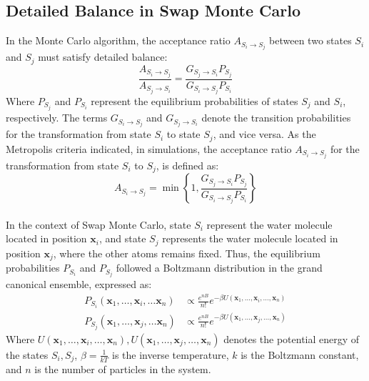 \documentclass[journal=jacsat,manuscript=article]{achemso}
\begin{document}
\subsection{Detailed Balance in Swap Monte Carlo}
In the Monte Carlo algorithm, the acceptance ratio $A_{S_i \to S_j}$ between two states $S_i$ and $S_j$ must satisfy detailed balance:
\begin{equation}\label{eq:acceptance_ratio}
\frac{A_{S_i \to S_j}}{A_{S_j \to S_i}}=\frac{G_{S_j \to S_i} P_{S_j}}{G_{S_i \to S_j} P_{S_i}}
\end{equation}
\noindent Where $P_{S_j}$ and $P_{S_i}$ represent the equilibrium probabilities of states $S_j$ and $S_i$, respectively. 
The terms $G_{S_i \to S_j}$ and $G_{S_j \to S_i}$ denote the transition probabilities for the transformation from state $S_i$ to state $S_j$, and vice versa.
As the Metropolis criteria indicated, in simulations, the acceptance ratio $A_{S_i \to S_j}$ for the transformation from state $S_i$ to $S_j$, is defined as:
\begin{equation}\label{eq:metropolis}
A_{S_i \to S_j}=\min \left\{1, \frac{G_{S_j \to S_i} P_{S_j}}{G_{S_i \to S_j} P_{S_i}}\right\}
\end{equation} \\
\newline
In the context of Swap Monte Carlo, state $S_i$ represent the water molecule located in position $\mathbf{x}_i$, and state $S_j$ represents the water molecule located in position $\mathbf{x}_j$, where the other atoms remains fixed.
Thus, the equilibrium probabilities $P_{S_i}$ and $P_{S_j}$ followed a Boltzmann distribution in the grand canonical ensemble, expressed as:
\begin{equation}\label{eq:equilibrium_probability}
  \begin{aligned}
  P_{S_i}\left(\mathbf{x}_1, \ldots, \mathbf{x}_i, \ldots\mathbf{x}_n\right) & \propto \frac{e^{n B}}{n!} e^{-\beta U\left(\mathbf{x}_1, \ldots, \mathbf{x}_i,\ldots, \mathbf{x}_n\right)}  \\
  P_{S_j}\left(\mathbf{x}_1, \ldots, \mathbf{x}_j, \ldots\mathbf{x}_n\right) & \propto \frac{e^{n B}}{n!} e^{-\beta U\left(\mathbf{x}_1, \ldots, \mathbf{x}_j,\ldots, \mathbf{x}_n\right)}
  \end{aligned}
\end{equation} 
Where $U\left(\mathbf{x}_1, \ldots, \mathbf{x}_i,\ldots, \mathbf{x}_n\right), U\left(\mathbf{x}_1, \ldots, \mathbf{x}_j,\ldots, \mathbf{x}_n\right)$ denotes the potential energy of the states $S_i, S_j$, 
$\beta = \frac{1}{kT}$ is the inverse temperature, $k$ is the Boltzmann constant, and $n$ is the number of particles in the system.
\end{document}
